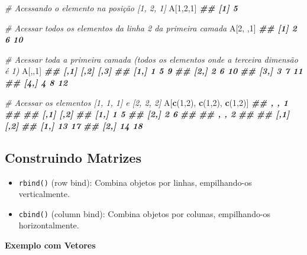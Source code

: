 \documentclass[
]{book}
\newenvironment{Shaded}{\begin{snugshade}}{\end{snugshade}}
\newcommand{\CommentTok}[1]{\textcolor[rgb]{0.56,0.35,0.01}{\textit{#1}}}
\newcommand{\DecValTok}[1]{\textcolor[rgb]{0.00,0.00,0.81}{#1}}
\newcommand{\DocumentationTok}[1]{\textcolor[rgb]{0.56,0.35,0.01}{\textbf{\textit{#1}}}}
\newcommand{\FunctionTok}[1]{\textcolor[rgb]{0.13,0.29,0.53}{\textbf{#1}}}
\newcommand{\NormalTok}[1]{#1}
\providecommand{\tightlist}{%
  \setlength{\itemsep}{0pt}\setlength{\parskip}{0pt}}
\begin{document}
\begin{Shaded}
\begin{Highlighting}[]
\CommentTok{\# Acessando o elemento na posição [1, 2, 1]}
\NormalTok{A[}\DecValTok{1}\NormalTok{,}\DecValTok{2}\NormalTok{,}\DecValTok{1}\NormalTok{]}
\DocumentationTok{\#\# [1] 5}

\CommentTok{\# Acessar todos os elementos da linha 2 da primeira camada}
\NormalTok{A[}\DecValTok{2}\NormalTok{, ,}\DecValTok{1}\NormalTok{]}
\DocumentationTok{\#\# [1]  2  6 10}

\CommentTok{\# Acessar toda a primeira camada (todos os elementos onde a terceira dimensão é 1)}
\NormalTok{A[,,}\DecValTok{1}\NormalTok{]}
\DocumentationTok{\#\#      [,1] [,2] [,3]}
\DocumentationTok{\#\# [1,]    1    5    9}
\DocumentationTok{\#\# [2,]    2    6   10}
\DocumentationTok{\#\# [3,]    3    7   11}
\DocumentationTok{\#\# [4,]    4    8   12}

\CommentTok{\# Acessar os elementos [1, 1, 1] e [2, 2, 2]}
\NormalTok{A[}\FunctionTok{c}\NormalTok{(}\DecValTok{1}\NormalTok{,}\DecValTok{2}\NormalTok{), }\FunctionTok{c}\NormalTok{(}\DecValTok{1}\NormalTok{,}\DecValTok{2}\NormalTok{), }\FunctionTok{c}\NormalTok{(}\DecValTok{1}\NormalTok{,}\DecValTok{2}\NormalTok{)]}
\DocumentationTok{\#\# , , 1}
\DocumentationTok{\#\# }
\DocumentationTok{\#\#      [,1] [,2]}
\DocumentationTok{\#\# [1,]    1    5}
\DocumentationTok{\#\# [2,]    2    6}
\DocumentationTok{\#\# }
\DocumentationTok{\#\# , , 2}
\DocumentationTok{\#\# }
\DocumentationTok{\#\#      [,1] [,2]}
\DocumentationTok{\#\# [1,]   13   17}
\DocumentationTok{\#\# [2,]   14   18}
\end{Highlighting}
\end{Shaded}

\subsection{Construindo Matrizes}\label{construindo-matrizes}

\begin{itemize}
\tightlist
\item
  \texttt{rbind()} (row bind): Combina objetos por linhas, empilhando-os
  verticalmente.
\item
  \texttt{cbind()} (column bind): Combina objetos por colunas, empilhando-os
  horizontalmente.
\end{itemize}

\textbf{Exemplo com Vetores}
\end{document}

